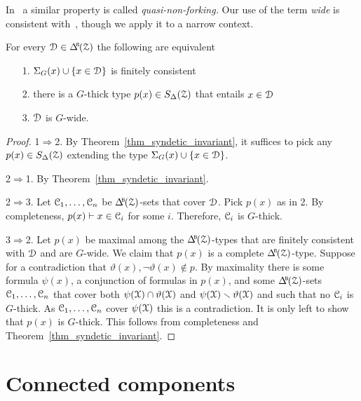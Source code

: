 In~\cite{CK} a similar property is called \textit{quasi-non-forking.}
Our use of the term \textit{wide\/} is consistent with~\cite{Hr}, though we apply it to a narrow context.

\begin{theorem}\label{thm_syndetic_invariant2}
  For every $\D\in\BDelta(\Z)$ the following are equivalent 
  \begin{itemize}
    \item[1.] $\Sigma_G(x)\cup\{x\in\EuScript D\}$ is finitely consistent
    \item[2.] there is a $G$-thick type $p(x)\in S_\Delta(\EuScript Z)$ that entails $x\in\EuScript D$
    \item[3.] $\EuScript D$ is $G$-wide.\smallskip
  \end{itemize}
\end{theorem}

\begin{proof}
  1$\Rightarrow$2.
  By Theorem~\ref{thm_syndetic_invariant}, it suffices to pick any $p(x)\in S_\Delta(\EuScript Z)$ extending the type $\Sigma_G(x)\cup\{x\in\EuScript D\}$.

  2$\Rightarrow$1.
  By Theorem~\ref{thm_syndetic_invariant}.

  2$\Rightarrow$3.
  Let $\EuScript C_1,\dots,\EuScript C_n$ be $\BDelta({\Z})$-sets that cover $\EuScript D$.
  Pick $p(x)$ as in 2.
  By completeness, $p(x)\vdash x\in\EuScript C_i$ for some $i$.
  Therefore, $\EuScript C_i$ is $G$-thick.

  3$\Rightarrow$2.
  Let $p(x)$ be maximal among the $\BDelta(\Z)$-types that are finitely consistent with $\EuScript D$ and are $G$-wide.
  We claim that $p(x)$ is a complete $\BDelta(\Z)$-type.
  Suppose for a contradiction that $\vartheta(x),\neg\vartheta(x)\notin p$.
  By maximality there is some formula $\psi(x)$, a conjunction of formulas in $p(x)$, and some $\BDelta({\Z})$-sets $\EuScript C_1,\dots,\EuScript C_n$ that cover both $\psi(\EuScript X)\cap\vartheta(\EuScript X)$ and $\psi(\EuScript X)\smallsetminus\vartheta(\EuScript X)$ and such that no $\EuScript C_i$ is $G$-thick.
  As $\EuScript C_1,\dots,\EuScript C_n$ cover $\psi(\EuScript X)$ this is a contradiction.
  It is only left to show that $p(x)$ is $G$-thick.
  This follows from completeness and Theorem~\ref{thm_syndetic_invariant}.
\end{proof}


\section{Connected components}\label{G0}
\def\medrel#1{\parbox[t]{5ex}{$\displaystyle\hfil #1$}}
\def\ceq#1#2#3{\parbox[t]{12ex}{$\displaystyle #1$}\medrel{#2}{$\displaystyle #3$}}

